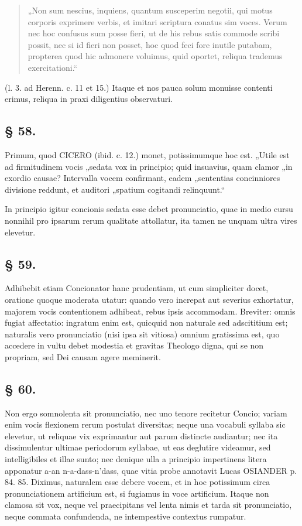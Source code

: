\begin{quote}
„Non sum nescius, inquiens, quantum susceperim negotii, qui motus corporis exprimere verbis, et imitari scriptura conatus sim voces. Verum nec hoc confusus sum posse fieri, ut de his rebus satis commode scribi possit, nec si id fieri non posset, hoc quod feci fore inutile putabam, propterea quod hic admonere voluimus, quid oportet, reliqua trademus exercitationi.“
\end{quote}

(l. 3. ad Herenn. c. 11 et 15.) Itaque et nos pauca solum monuisse contenti erimus, reliqua in praxi diligentius observaturi.

\subsection*{§ 58.}

Primum, quod CICERO (ibid. c. 12.) monet, potissimumque hoc est. „Utile est ad firmitudinem vocis „sedata vox in principio; quid insuavius, quam clamor „in exordio causae? Intervalla vocem confirmant, eadem „sententias concinniores divisione reddunt, et auditori „spatium cogitandi relinquunt.“

In principio igitur concionis sedata esse debet pronunciatio, quae in medio cursu nonnihil pro ipsarum rerum qualitate attollatur, ita tamen ne unquam ultra vires elevetur.

\subsection*{§ 59.}

Adhibebit etiam Concionator hanc prudentiam, ut cum simpliciter docet, oratione quoque moderata utatur: quando vero increpat aut severius exhortatur, majorem vocis contentionem adhibeat, rebus ipsis accommodam. Breviter: omnis fugiat affectatio: ingratum enim est, quicquid non naturale sed adscititium est; naturalis vero pronunciatio (nisi ipsa sit vitiosa) omnium gratissima est, quo accedere in vultu debet modestia et gravitas Theologo digna, qui se non propriam, sed Dei causam agere meminerit.

\subsection*{§ 60.}

Non ergo somnolenta sit pronunciatio, nec uno tenore recitetur Concio; variam enim vocis flexionem rerum postulat diversitas; neque una vocabuli syllaba sic elevetur, ut reliquae vix exprimantur aut parum distincte audiantur; nec ita dissimulentur ultimae periodorum syllabae, ut eas deglutire videamur, sed intelligibiles et illae sunto; nec denique ulla a principio impertinens litera apponatur a-an n-a-dass-n’dass, quae vitia probe annotavit Lucas OSIANDER p. 84. 85. Diximus, naturalem esse debere vocem, et in hoc potissimum circa pronunciationem artificium est, si fugiamus in voce artificium. Itaque non clamosa sit vox, neque vel praecipitans vel lenta nimis et tarda sit pronunciatio, neque commata confundenda, ne intempestive contextus rumpatur.

